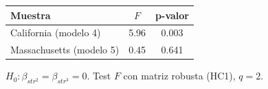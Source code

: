 
\begin{tabular}{lcc}
\toprule
Muestra & $F$ & p-valor\\
\midrule
California (modelo 4) & 5.96 & 0.003\\
Massachusetts (modelo 5) & 0.45 & 0.641\\
\bottomrule
\end{tabular}
\par\vspace{3pt}
{\footnotesize\parbox{0.9\linewidth}{\centering $H_0:\beta_{str^2}=\beta_{str^3}=0$. Test $F$ con matriz robusta (HC1), $q=2$.}}
